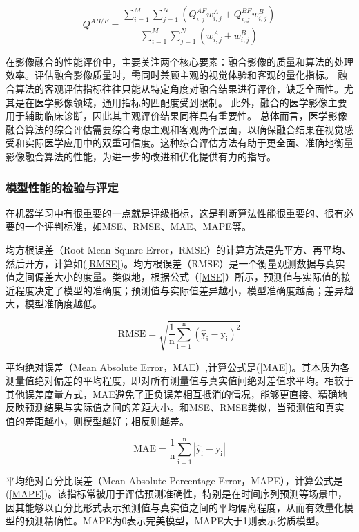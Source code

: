 \begin{equation}\label{Qabf}
Q^{AB/F}=\frac{\sum_{i=1}^{M}\sum_{j=1}^{N}(Q_{i,j}^{AF}w_{i,j}^{A}+Q_{i,j}^{BF}w_{i,j}^{B})}{\sum_{i=1}^{M}\sum_{j=1}^{N}(w_{i,j}^{A}+w_{i,j}^{B})}
\end{equation}


在影像融合的性能评价中，主要关注两个核心要素：融合影像的质量和算法的处理效率。评估融合影像质量时，需同时兼顾主观的视觉体验和客观的量化指标。
融合算法的客观评估指标往往只能从特定角度对融合结果进行评价，缺乏全面性。尤其是在医学影像领域，通用指标的匹配度受到限制。
此外，融合的医学影像主要用于辅助临床诊断，因此其主观评价结果同样具有重要性。
总体而言，医学影像融合算法的综合评估需要综合考虑主观和客观两个层面，以确保融合结果在视觉感受和实际医学应用中的双重可信度。这种综合评估方法有助于更全面、准确地衡量影像融合算法的性能，为进一步的改进和优化提供有力的指导。

\subsubsection{模型性能的检验与评定}
在机器学习中有很重要的一点就是评级指标，这是判断算法性能很重要的、很有必要的一个评判标准，如MSE、RMSE、MAE、MAPE等\cite{willmott2005advantages}。

均方根误差（Root Mean Square Error，RMSE）的计算方法是先平方、再平均、然后开方，计算如(\ref{RMSE})。均方根误差（RMSE）是一个衡量观测数据与真实值之间偏差大小的度量。类似地，根据公式（\ref{MSE}）所示，预测值与实际值的接近程度决定了模型的准确度；预测值与实际值差异越小，模型准确度越高；差异越大，模型准确度越低。

\begin{equation}\label{RMSE}
\text{RMSE}=\sqrt{\frac{1}{\text{n}}\sum_{\mathrm{i}=1}^\mathrm{n}\left(\hat{\mathrm{y}}_\mathrm{i}-\mathrm{y}_\mathrm{i}\right)^2}
\end{equation}

平均绝对误差（Mean Absolute Error，MAE）,计算公式是(\ref{MAE})。其本质为各测量值绝对偏差的平均程度，即对所有测量值与真实值间绝对差值求平均。相较于其他误差度量方式，MAE避免了正负误差相互抵消的情况，能够更直接、精确地反映预测结果与实际值之间的差距大小。和MSE、RMSE类似，当预测值和真实值的差距越小，则模型越好；相反则越差。

\begin{equation}\label{MAE}
\mathrm M\mathrm A\mathrm E=\frac1{\mathrm n}\sum_{\mathrm i=1}^\mathrm{n}|\hat{\mathrm y}_\mathrm{i}-\mathrm y_\mathrm{i}|
\end{equation}

平均绝对百分比误差（Mean Absolute Percentage Error，MAPE），计算公式是(\ref{MAPE})。该指标常被用于评估预测准确性，特别是在时间序列预测等场景中，因其能够以百分比形式表示预测值与真实值之间的平均偏离程度，从而有效量化模型的预测精确性。MAPE为0表示完美模型，MAPE大于1则表示劣质模型。

